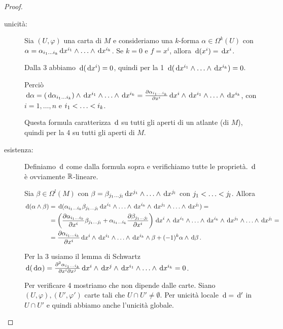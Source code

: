 \begin{proof}
	\begin{description}
		\item [unicità:] Sia $(U,\varphi)$ una carta di $M$ e consideriamo una $k$-forma $\alpha\in\Omega^k(U)$ con $\alpha = \alpha_{\seqb ik{}} \de x^{i_1} \wedge \ldots \wedge \de x^{i_k}$.
		Se $k=0$ e $f=x^i$, allora $\de(x^i) = \de x^i$.
		
		Dalla 3 abbiamo $\de(\de x^i) = 0$, quindi per la 1 $\de(\de x^{i_1} \wedge \ldots \wedge \de x^{i_k}) = 0$.
		
		Perciò $\de\alpha = (\de \alpha_{\seqb ik{}}) \wedge \de x^{i_1} \wedge \ldots\wedge \de x^{i_k} = \DerParz{\alpha_{\seqb ik{}}} {x^i} \de x^i \wedge \de x^{i_1} \wedge\ldots \wedge \de x^{i_k}$, con $i=1,\ldots,n$ e $\seqb ik<$.
		
		Questa formula caratterizza $\de$ su tutti gli aperti di un atlante (di $M$), quindi per la 4 su tutti gli aperti di $M$.
		\item [esistenza:] Definiamo $\de$ come dalla formula sopra e verifichiamo tutte le proprietà. $\de$ è ovviamente $\R$-lineare.
		
		Sia $\beta\in\Omega^l(M)$ con $\beta= \beta_{\seqb jl{}} \de x^{j_1} \wedge\ldots\wedge \de x^{j_l}$ con $\seqb jl<$. Allora
		\begin{align*}
			\de (\alpha \wedge \beta) &= \de (\alpha_{\seqb ik{}} \beta_{\seqb jl{}} \de x^{i_1} \wedge\ldots\wedge \de x^{i_k}\wedge \de x^{j_1} \wedge\ldots\wedge \de x^{j_l}) =\\
			&= \left(\DerParz{\alpha_{\seqb ik{}}}{x^i} \beta_{\seqb jl{}} + \alpha_{\seqb ik{}} \DerParz{\beta_{\seqb jl{}}}{x^i} \right) \de x^i\wedge\de x^{i_1} \wedge\ldots\wedge \de x^{i_k}\wedge \de x^{j_1} \wedge\ldots\wedge \de x^{j_l} = \\
			&=\DerParz{\alpha_{\seqb ik{}}}{x^i} \de x^i\wedge\de x^{i_1} \wedge\ldots\wedge \de x^{i_k} \wedge \beta + (-1)^k \alpha \wedge \de \beta \punto
		\end{align*}
		
		Per la 3 usiamo il lemma di Schwartz $\de(\de\alpha) = \frac{\partial^2 \alpha_{\seqb ik{}}}{\partial x^i \partial x^j} \de x^i\wedge\de x^j \wedge\de x^{i_1} \wedge\ldots\wedge \de x^{i_k} =0$.
		
		Per verificare 4 mostriamo che non dipende dalle carte. Siano $(U,\varphi), (U',\varphi')$ carte tali che $U\cap U' \not=\emptyset$. Per unicità locale $\de = \de'$ in $U\cap U'$ e quindi abbiamo anche l'unicità globale.
	\end{description}
\end{proof}

